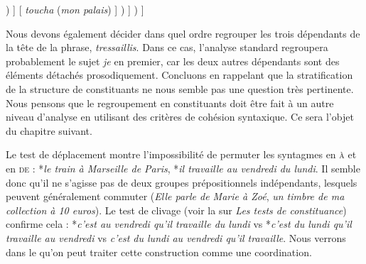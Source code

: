 {    \begin{exe}
    \relax
        [ \textit{à} ( \textit{l’} [ (\textit{instant même}) ( \textit{où} [ \textit{la} (\textit{gorgée} [\textit{mêlée des miettes du gâteau}] ) ] [ \textit{toucha} (\textit{mon palais}) ] ) ] ) ]
    \end{exe}
    Nous devons également décider dans quel ordre regrouper les trois dépendants de la tête de la phrase, \textit{tressaillis}. Dans ce cas, l’analyse standard regroupera probablement le sujet \textit{je} en premier, car les deux autres dépendants sont des éléments détachés prosodiquement. Concluons en rappelant que la stratification de la structure de constituants ne nous semble pas une question très pertinente. Nous pensons que le regroupement en constituants doit être fait à un autre niveau d’analyse en utilisant des critères de cohésion syntaxique. Ce sera l’objet du chapitre suivant.
 
  Le test de déplacement montre l’impossibilité de permuter les syntagmes en \textsc{à} et en \textsc{de} : *\textit{le train à Marseille de Paris}, *\textit{il travaille au vendredi du lundi}. Il semble donc qu’il ne s’agisse pas de deux groupes prépositionnels indépendants, lesquels peuvent généralement commuter (\textit{Elle parle de Marie à Zoé}, \textit{un timbre de ma collection à 10 euros}). Le test de clivage (voir la  sur \textit{Les tests de constituance}) confirme cela : *\textit{c’est au vendredi qu’il travaille du lundi} vs *\textit{c’est du lundi qu’il travaille au vendredi} vs \textit{c’est du lundi au vendredi qu’il travaille}. Nous verrons dans le  qu’on peut traiter cette construction comme une coordination.
}

